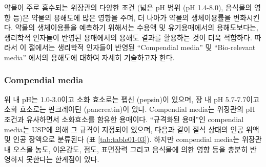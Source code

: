 \documentclass[
  11pt,
  krantz2, a4paper, twoside]{krantz}
\begin{document}
약물이 주로 흡수되는 위장관의 다양한 조건 (넓은 pH 범위 (pH 1.4-8.0), 음식물의 영향 등)은 약물의 용해도에 많은 영향을 주며, 더 나아가 약물의 생체이용률을 변화시킨다.
약물의 생체이용률을 예측하기 위해서는 수용액 및 유기용매에서의 용해도보다는, 생리학적 인자들이 반영된 용매에서의 용해도 결과를 활용하는 것이 더욱 적합하다. 따라서 이 절에서는 생리학적 인자들이 반영된 ``Compendial media'' 및 ``Bio-relevant media'' 에서의 용해도에 대하여 자세히 기술하고자 한다.

\hypertarget{compendial-media}{%
\subsubsection{Compendial media}\label{compendial-media}}

위 내 pH는 1.0-3.0이고 소화 효소로는 펩신 (pepsin)이 있으며, 장 내 pH 5.7-7.7이고 소화 효소로는 판크레아틴 (pancreatin)이 있다. Compendial media는 위장관의 pH 조건과 유사하면서 소화효소를 함유한 용매이다.
``규격화된 용매''인 compendial media는 USP에 의해 그 규격이 지정되어
있으며, 다음과 같이 절식 상태의 인공 위액 및 인공 장액으로 분류된다 (표 \ref{tab:table01-03}).
하지만 compendial media는 위장관 내 오스몰 농도, 이온강도, 점도, 표면장력 그리고 음식물에 의한 영향 등을 충분히 반영하지 못한다는 한계점이 있다.
\end{document}
